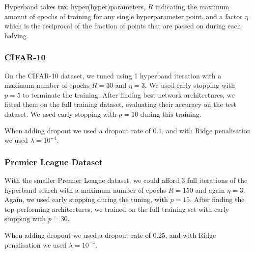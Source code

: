        Hyperband takes two hyper(hyper)parameters, $R$ indicating the maximum amount of epochs of training for any single hyperparameter point, and a factor $\eta$ which is the reciprocal of the fraction of points that are passed on during each halving.


    \subsubsection{CIFAR-10}
        On the CIFAR-10 dataset, we tuned using 1 hyperband iteration with a maximum number of epochs $R=30$ and $\eta=3$. We used early stopping with $p=5$ to terminate the training. After finding best network architectures, we fitted them on the full training dataset, evaluating their accuracy on the test dataset. We used early stopping with $p=10$ during this training.

        When adding dropout we used a dropout rate of $0.1$, and with Ridge penalisation we used $\lambda=10^{-4}$.

    \subsubsection{Premier League Dataset}
        With the smaller Premier League dataset, we could afford 3 full iterations of the hyperband search with a maximum number of epochs $R=150$ and again $\eta=3$. Again, we used early stopping during the tuning, with $p=15$. After finding the top-performing architectures, we trained on the full training set with early stopping with $p=30$.

        When adding dropout we used a dropout rate of $0.25$, and with Ridge penalisation we used $\lambda=10^{-4}$.
